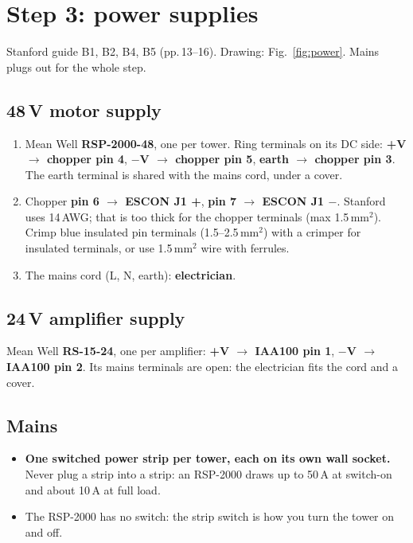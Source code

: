 \section{Step 3: power supplies}\label{sec:walk-power}
Stanford guide B1, B2, B4, B5 (pp.\,13--16). Drawing: Fig.~\ref{fig:power}. Mains plugs out for the whole step.

\subsection{48\,V motor supply}
\begin{enumerate}
\item Mean Well \textbf{RSP-2000-48}, one per tower. Ring terminals on its DC side:
\textbf{+V $\rightarrow$ chopper pin 4}, \textbf{$-$V $\rightarrow$ chopper pin 5},
\textbf{earth $\rightarrow$ chopper pin 3}. The earth terminal is shared with the mains cord, under a cover.
\item Chopper \textbf{pin 6 $\rightarrow$ ESCON J1 +}, \textbf{pin 7 $\rightarrow$ ESCON J1 $-$}. Stanford
uses 14\,AWG; that is too thick for the chopper terminals (max 1.5\,mm$^2$). Crimp blue insulated pin
terminals (1.5--2.5\,mm$^2$) with a crimper for insulated terminals, or use 1.5\,mm$^2$ wire with ferrules.
\item The mains cord (L, N, earth): \textbf{electrician}.
\end{enumerate}

\subsection{24\,V amplifier supply}
Mean Well \textbf{RS-15-24}, one per amplifier: \textbf{+V $\rightarrow$ IAA100 pin 1},
\textbf{$-$V $\rightarrow$ IAA100 pin 2}. Its mains terminals are open: the electrician fits the cord and a
cover.

\subsection{Mains}
\begin{itemize}
\item \textbf{One switched power strip per tower, each on its own wall socket.} Never plug a strip into a
strip: an RSP-2000 draws up to 50\,A at switch-on and about 10\,A at full load.
\item The RSP-2000 has no switch: the strip switch is how you turn the tower on and off.
\end{itemize}

